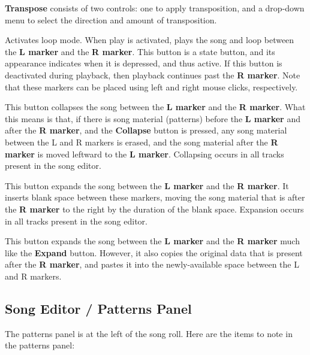    \textbf{Transpose} consists of two controls: one to apply
   transposition, and a drop-down menu to select the direction and amount
   of transposition.

   Activates loop mode. When play is activated, plays the song and loop
   between the
   \textbf{L marker} and the \textbf{R marker}.
   This button is a state button, and its appearance indicates when it is
   depressed, and thus active.
   If this button is deactivated during playback, then playback
   continues past the \textbf{R marker}.
   Note that these markers can be placed using left
   and right mouse clicks, respectively.

   This button collapses the song between the \textbf{L marker} and the
   \textbf{R marker}.
   What this means is that, if there is song material (patterns) before the
   \textbf{L marker} and after the \textbf{R marker},
   and the \textbf{Collapse} button is
   pressed, any song material between the L and R markers is erased, and
   the song material after the \textbf{R marker} is moved leftward to
   the \textbf{L marker}.
   Collapsing occurs in all tracks present in the song editor.

   This button expands the song between the
   \textbf{L marker} and the \textbf{R marker}.
   It inserts blank space between these markers, moving the song material
   that is after the \textbf{R marker}
   to the right by the duration of the blank space.
   Expansion occurs in all tracks present in the song editor.

   This button expands the song between the \textbf{L marker} and the
   \textbf{R marker} much like the \textbf{Expand} button.
   However, it also copies the original data that is present after the
   \textbf{R marker}, and pastes it into the newly-available space between
   the L and R markers.

\subsection{Song Editor / Patterns Panel}
\label{subsec:song_editor_patterns_panel}

   The patterns panel is at the left of the song roll.
   Here are the items to note in the patterns panel:

